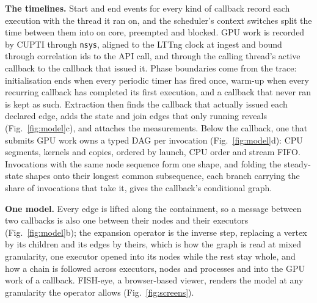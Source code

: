 \noindent\textbf{The timelines.} Start and end events for every kind of callback record each execution with the thread it ran on, and the scheduler's context switches split the time between them into on core, preempted and blocked. GPU work is recorded by CUPTI through \texttt{nsys}, aligned to the LTTng clock at ingest and bound through correlation ids to the API call, and through the calling thread's active callback to the callback that issued it. Phase boundaries come from the trace: initialisation ends when every periodic timer has fired once, warm-up when every recurring callback has completed its first execution, and a callback that never ran is kept as such. Extraction then finds the callback that actually issued each declared edge, adds the state and join edges that only running reveals (Fig.~\ref{fig:model}c), and attaches the measurements. Below the callback, one that submits GPU work owns a typed DAG per invocation (Fig.~\ref{fig:model}d): CPU segments, kernels and copies, ordered by launch, CPU order and stream FIFO. Invocations with the same node sequence form one shape, and folding the steady-state shapes onto their longest common subsequence, each branch carrying the share of invocations that take it, gives the callback's conditional graph.

\noindent\textbf{One model.} Every edge is lifted along the containment, so a message between two callbacks is also one between their nodes and their executors (Fig.~\ref{fig:model}b); the expansion operator is the inverse step, replacing a vertex by its children and its edges by theirs, which is how the graph is read at mixed granularity, one executor opened into its nodes while the rest stay whole, and how a chain is followed across executors, nodes and processes and into the GPU work of a callback. FISH-eye, a browser-based viewer, renders the model at any granularity the operator allows (Fig.~\ref{fig:screens}).
